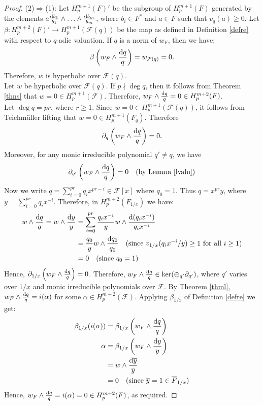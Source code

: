 \documentclass[times,10pt]{amsart}
\newcommand{\dd}{{\rm d}}
\newcommand{\F}{\ensuremath{\mathcal{F}}}
\begin{document}
           \begin{proof}
                (2)$\Rightarrow{}$(1): Let $H_p^{m+1}(F)'$ be the subgroup of $H_p^{m+1}(F)$ generated by the elements $ a\frac{\dd b_1}{b_1}\wedge\ldots\wedge \frac{\dd b_m}{b_m}$, where $b_i\in F^*$ and $a\in F$ such that $v_q(a)\geq 0$.   Let $\beta:H_p^{m+2}(F)'\xrightarrow{} H_p^{m+1}(\F(q))$ be the map  as defined in Definition \ref{defre} with respect to  $q$-adic valuation.  If $q$ is a norm of $w_F$, then we have:\begin{align*}
                    \beta\left(w_F\wedge \frac{\dd q}{q}\right)= w_{\F(q)}=0.
                \end{align*} Therefore, $w$ is hyperbolic over $\F(q)$.\\
                
                 Let $w$ be hyperbolic over $\F(q)$.  If $p\nmid \deg q$, then it follows from  Theorem \ref{thns} that $w=0\in H_p^{m+1}(\F)$. Therefore, $w_F\wedge \frac{\dd q}{q}=0\in H_p^{m+2}(F)$. \\ Let $\deg q= pr$, where $r\geq 1$.  Since $w=0\in H_p^{m+1}(\F(q))$, it follows from Teichm\"uller lifting that  $w=0\in H_p^{m+1}(F_q)$. Therefore $$\partial_q\left( w_F\wedge \frac{\dd q}{q}\right)=0.$$ Moreover, for any monic irreducible polynomial $q'\neq q$, we have $$ \partial_{q'}\left(  w_F\wedge \frac{\dd q}{q}\right)=0\quad \text{(by Lemma \ref{lvalu})}$$Now we write  $q= \sum\limits_{i=0}^{pr} q_i x^{pr-i} \in \F[x]$ where $q_0=1$. Thus $q=  x^{pr} y$, where $ y= \sum\limits_{i=0}^{pr} q_i x^{-i}$. Therefore, in $H_p^{m+2}(F_{1/x})$ we have: \begin{align*}
                       w\wedge \frac{\dd q}{q}= w\wedge \frac{\dd y}{y}&= \sum_{i=0}^{pr} \frac{ q_ix^{-i}}{y}w\wedge \frac{\dd (q_i x^{-i})}{q_ix^{-i}} \\&= \frac{q_0}{y} w\wedge \frac{\dd q_0}{q_0}\quad \text{(since $v_{1/x}( {q_ix^{-i}}/{y})\geq 1$ for all $i\geq 1$)}\\&= 0\quad \text{(since $q_0=1$)}
                \end{align*} Hence,  $\partial_{1/x}\left( w_{F}\wedge \frac{\dd q}{q}\right)=0$. Therefore, $w_{F}\wedge \frac{\dd q}{q}\in \ker(\oplus_{q'}\partial_{q'})$, where $q'$ varies over $1/x$ and monic irreducible polynomials over $\F$. By Theorem \ref{thml},  $ w_F\wedge \frac{\dd q}{q}=i(\alpha)$ for some $\alpha\in H_p^{m+2}(\F)$.   Applying $\beta_{1/x}$ of Definition \ref{defre} we get: \begin{align*}
                     \beta_{1/x}( i(\alpha))&= \beta_{1/x}\left(w_F\wedge \frac{\dd q}{q}\right)\\ \alpha &=\beta_{1/x}\left( w_F\wedge \frac{\dd y}{y}\right)\\&= w\wedge \frac{\dd \overline{y}}{\overline{y}}\\&=0\quad \text{(since $\overline{y}=1\in \overline{F}_{1/x}$)}
                \end{align*} Hence, $ w_F\wedge 
                \frac{\dd q}{q}=i(\alpha)=0\in H_p^{m+2}(F)$, as required.
           \end{proof}
\end{document}
